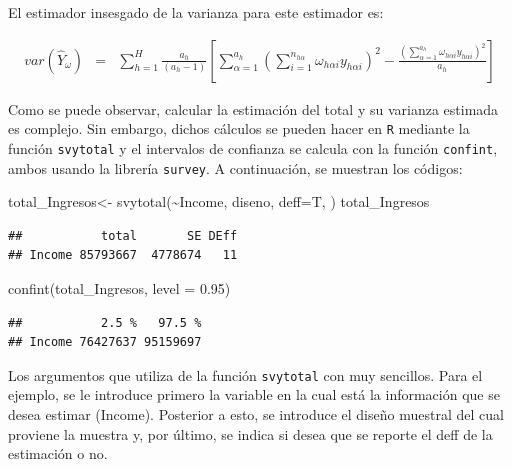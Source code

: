 \documentclass[
  12pt,
]{book}
\newenvironment{Shaded}{\begin{snugshade}}{\end{snugshade}}
\newcommand{\AttributeTok}[1]{\textcolor[rgb]{0.77,0.63,0.00}{#1}}
\newcommand{\FloatTok}[1]{\textcolor[rgb]{0.00,0.00,0.81}{#1}}
\newcommand{\FunctionTok}[1]{\textcolor[rgb]{0.00,0.00,0.00}{#1}}
\newcommand{\NormalTok}[1]{#1}
\newcommand{\OtherTok}[1]{\textcolor[rgb]{0.56,0.35,0.01}{#1}}
\newcommand{\SpecialCharTok}[1]{\textcolor[rgb]{0.00,0.00,0.00}{#1}}
\begin{document}
El estimador insesgado de la varianza para este estimador es:

\begin{eqnarray*}
var\left(\hat{Y}_{\omega}\right) & = & \sum_{h=1}^{H}\frac{a_{h}}{\left(a_{h}-1\right)}\left[\sum_{\alpha=1}^{a_{h}}\left(\sum_{i=1}^{n_{h\alpha}}\omega_{h\alpha i}y_{h\alpha i}\right)^{2}-\frac{\left({ \sum_{\alpha=1}^{a_{h}}}\omega_{h\alpha i}y_{h\alpha i}\right)^{2}}{a_{h}}\right]
\end{eqnarray*}

Como se puede observar, calcular la estimación del total y su varianza estimada es complejo. Sin embargo, dichos cálculos se pueden hacer en \texttt{R} mediante la función \texttt{svytotal} y el intervalos de confianza se calcula con la función \texttt{confint}, ambos usando la librería \texttt{survey}. A continuación, se muestran los códigos:

\begin{Shaded}
\begin{Highlighting}[]
\NormalTok{total\_Ingresos}\OtherTok{\textless{}{-}} \FunctionTok{svytotal}\NormalTok{(}\SpecialCharTok{\textasciitilde{}}\NormalTok{Income, diseno, }\AttributeTok{deff=}\NormalTok{T, )}
\NormalTok{total\_Ingresos}
\end{Highlighting}
\end{Shaded}

\begin{verbatim}
##           total       SE DEff
## Income 85793667  4778674   11
\end{verbatim}

\begin{Shaded}
\begin{Highlighting}[]
\FunctionTok{confint}\NormalTok{(total\_Ingresos, }\AttributeTok{level =} \FloatTok{0.95}\NormalTok{)}
\end{Highlighting}
\end{Shaded}

\begin{verbatim}
##           2.5 %   97.5 %
## Income 76427637 95159697
\end{verbatim}

Los argumentos que utiliza de la función \texttt{svytotal} con muy sencillos. Para el ejemplo, se le introduce primero la variable en la cual está la información que se desea estimar (Income). Posterior a esto, se introduce el diseño muestral del cual proviene la muestra y, por último, se indica si desea que se reporte el deff de la estimación o no.
\end{document}
